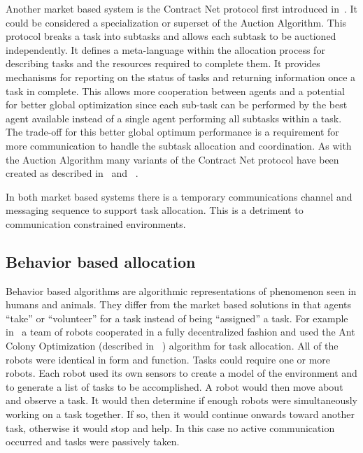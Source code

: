 Another market based system is the Contract Net protocol first introduced in~\citet{contract_net}.  It could be considered a specialization or superset of the Auction Algorithm.  This protocol breaks a task into subtasks and allows each subtask to be auctioned independently. It defines a meta-language within the allocation process for describing tasks and the resources required to complete them.  It provides mechanisms for reporting on the status of tasks and returning information once a task in complete.  This allows more cooperation between agents and a potential for better global optimization since each sub-task can be performed by the best agent available instead of a single agent performing all subtasks within a task.  The trade-off for this better global optimum performance is a requirement for more communication to handle the subtask allocation and coordination.  As with the Auction Algorithm many variants of the Contract Net protocol have been created as described in~\citet{contract_survey} and ~\citet{contract_equity}.

In both market based systems there is a temporary communications channel and messaging sequence to support task allocation.  This is a detriment to communication constrained environments.

\subsection{Behavior based allocation}

Behavior based algorithms are algorithmic representations of phenomenon seen in humans and animals. They differ from the market based solutions in that agents ``take'' or ``volunteer'' for a task instead of being ``assigned'' a task.  For example in~\citet{ant_colony_opt} a team of robots cooperated in a fully decentralized fashion and used the Ant Colony Optimization (described in ~\citet{wiki:aco}) algorithm for task allocation.  All of the robots were identical in form and function.  Tasks could require one or more robots.  Each robot used its own sensors to create a model of the environment and to generate a list of tasks to be accomplished.  A robot would then move about and observe a task.  It would then determine if enough robots were simultaneously working on a task together.  If so, then it would continue onwards toward another task, otherwise it would stop and help.  In this case no active communication occurred and tasks were passively taken.

